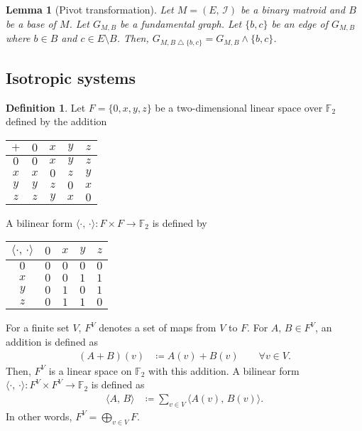 \documentclass[twoside,10pt]{article}
\newtheorem{lemma}[theorem]{Lemma}
\theoremstyle{definition}
\newtheorem{definition}[theorem]{Definition}
\theoremstyle{remark}
\begin{document}
\begin{lemma}[Pivot transformation]
Let $M=(E,\,\mathcal{I})$ be a binary matroid and $B$ be a base of $M$.
Let $G_{M,B}$ be a fundamental graph.
Let $\{b,c\}$ be an edge of $G_{M,B}$ where $b\in B$ and $c\in E\setminus B$.
Then, $G_{M,B\bigtriangleup\{b,c\}} = G_{M,B} \wedge \{b,c\}$.
\end{lemma}


\subsection{Isotropic systems}

\begin{definition}
Let $F=\{0,x,y,z\}$ be a two-dimensional linear space over $\mathbb{F}_2$ defined by the addition
\begin{table}[h]
\centering
\begin{tabular}{|c|cccc|}
\hline
$+$&$0$&$x$&$y$&$z$\\
\hline
$0$&$0$&$x$&$y$&$z$\\
$x$&$x$&$0$&$z$&$y$\\
$y$&$y$&$z$&$0$&$x$\\
$z$&$z$&$y$&$x$&$0$\\
\hline
\end{tabular}
\end{table}

A bilinear form $\langle\cdot,\,\cdot\rangle\colon F\times F\to\mathbb{F}_2$ is defined by
\begin{table}[h]
\centering
\begin{tabular}{|c|cccc|}
\hline
$\langle\cdot,\,\cdot\rangle$&$0$&$x$&$y$&$z$\\
\hline
$0$&$0$&$0$&$0$&$0$\\
$x$&$0$&$0$&$1$&$1$\\
$y$&$0$&$1$&$0$&$1$\\
$z$&$0$&$1$&$1$&$0$\\
\hline
\end{tabular}
\end{table}

For a finite set $V$, $F^V$ denotes a set of maps from $V$ to $F$.
For $A,\, B\in F^V$, an addition is defined as
\begin{align*}
(A+B)(v)&\coloneq A(v) + B(v)\qquad\forall v\in V.
\end{align*}
Then, $F^V$ is a linear space on $\mathbb{F}_2$ with this addition.
A bilinear form $\langle\cdot,\,\cdot\rangle\colon F^V\times F^V\to\mathbb{F}_2$ is defined as
\begin{align*}
\langle A,\,B\rangle &\coloneqq \sum_{v\in V} \langle A(v),\,B(v)\rangle.
\end{align*}
In other words, $F^V = \bigoplus_{v\in V}F$.
\end{definition}
\end{document}

